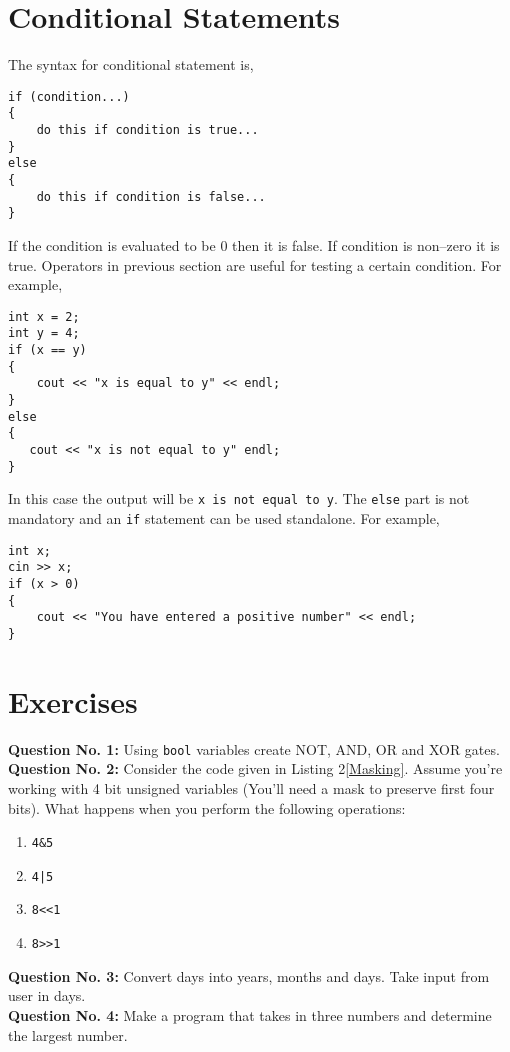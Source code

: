\documentclass[12pt,a4paper]{article}
\begin{document}
\section{Conditional Statements}
The syntax for conditional statement is,
\begin{lstlisting}
if (condition...)
{
    do this if condition is true...
}
else
{
    do this if condition is false...
}
\end{lstlisting}
If the condition is evaluated to be 0 then it is false. If condition is non--zero it is true.
Operators in previous section are useful for testing a certain condition. For example,
\begin{lstlisting}
int x = 2;
int y = 4;
if (x == y)
{
    cout << "x is equal to y" << endl;
}
else
{
   cout << "x is not equal to y" endl;
}
\end{lstlisting}
In this case the output will be \verb|x is not equal to y|. The \verb|else| part is not mandatory and an \verb|if| statement can be used standalone. For example,
\begin{lstlisting}
int x;
cin >> x;
if (x > 0)
{
    cout << "You have entered a positive number" << endl;
}
\end{lstlisting}
\section{Exercises}
\noindent\textbf{Question No. 1:} Using \verb|bool| variables create NOT, AND, OR and XOR gates.\\
\noindent\textbf{Question No. 2:} Consider the code given in Listing 2\ref{Masking}. Assume you're working with 4 bit unsigned variables (You'll need a mask to preserve first four bits). What happens when you perform the following operations:
\begin{enumerate}
\item \verb|4&5|
\item \verb$4|5$
\item \verb|8<<1|
\item \verb|8>>1|
\end{enumerate}
\noindent\textbf{Question No. 3:} Convert days into years, months and days. Take input from user in days.\\
\noindent\textbf{Question No. 4:} Make a program that takes in three numbers and determine the largest number.\\
\end{document}
